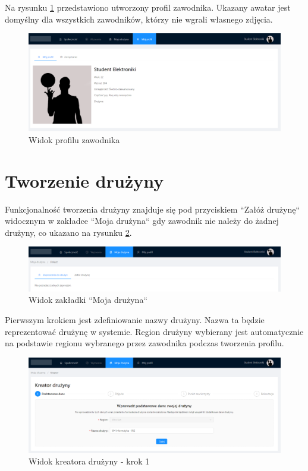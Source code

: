 Na rysunku \ref{fig:ss-profile-ready} przedstawiono utworzony profil zawodnika. Ukazany awatar jest domyślny dla wszystkich zawodników, którzy nie wgrali własnego zdjęcia.

\begin{figure}[H]
\centering
\includegraphics[width=\linewidth]{065-dzialanie/rys/ss-profile-ready.PNG}
\caption{Widok profilu zawodnika}
\label{fig:ss-profile-ready}
\end{figure}

\section{Tworzenie drużyny}
Funkcjonalność tworzenia drużyny znajduje się pod przyciskiem ``Załóż drużynę`` widocznym w zakładce ``Moja drużyna`` gdy zawodnik nie należy do żadnej drużyny, co ukazano na rysunku \ref{fig:ss-team-no}.

\begin{figure}[H]
\centering
\includegraphics[width=\linewidth]{065-dzialanie/rys/ss-team-no.PNG}
\caption{Widok zakładki ``Moja drużyna``}
\label{fig:ss-team-no}
\end{figure}

Pierwszym krokiem jest zdefiniowanie nazwy drużyny. Nazwa ta będzie reprezentować drużynę w systemie. Region drużyny wybierany jest automatycznie na podstawie regionu wybranego przez zawodnika podczas tworzenia profilu.


\begin{figure}[H]
\centering
\includegraphics[width=\linewidth]{065-dzialanie/rys/ss-team-1.PNG}
\caption{Widok kreatora drużyny - krok 1}
\label{fig:ss-team-1}
\end{figure}

